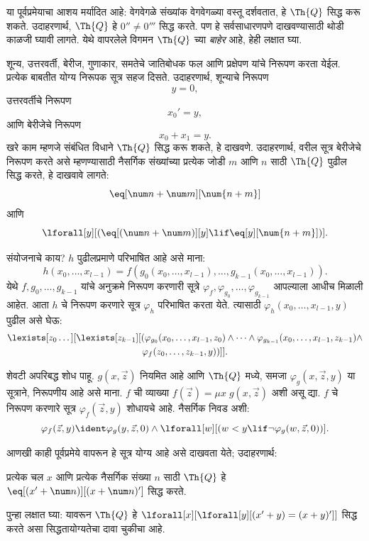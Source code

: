 या पूर्वप्रमेयाचा आशय मर्यादित आहे: वेगवेगळे संख्यांक
वेगवेगळ्या वस्तू दर्शवतात, हे $\Th{Q}$ सिद्ध करू शकते. उदाहरणार्थ,
$\Th{Q}$ हे $0'' \neq 0'''$ सिद्ध करते. पण हे सर्वसाधारणपणे
दाखवण्यासाठी थोडी काळजी घ्यावी लागते. येथे वापरलेले विगमन
$\Th{Q}$ च्या \emph{बाहेर} आहे, हेही लक्षात घ्या.

शून्य, उत्तरवर्ती, बेरीज, गुणाकार, समतेचे जातिबोधक फल
आणि प्रक्षेपण यांचे निरूपण करता येईल. प्रत्येक बाबतीत योग्य
निरूपक सूत्र सहज दिसते. उदाहरणार्थ, शून्याचे निरूपण
\[
y = 0,
\]
उत्तरवर्तीचे निरूपण
\[
x_0' = y,
\]
आणि बेरीजेचे निरूपण
\[
x_0 + x_1 = y.
\]
खरे काम म्हणजे संबंधित विधाने $\Th{Q}$ सिद्ध करू शकते, हे
दाखवणे. उदाहरणार्थ, वरील सूत्र बेरीजेचे निरूपण करते असे
म्हणण्यासाठी नैसर्गिक संख्यांच्या प्रत्येक जोडी $m$ आणि $n$
साठी $\Th{Q}$ पुढील सिद्ध करते, हे दाखवावे लागते:
\[
\eq[\num n + \num m][\num {n+m}]
\]
आणि
\[
\lforall[y][(\eq[(\num n + \num m)][y] \lif \eq[y][\num {n+m}])].
\]

संयोजनाचे काय? $h$ पुढीलप्रमाणे परिभाषित आहे असे माना:
\[
h(x_0,\dots,x_{l-1}) = f(g_0(x_0,\dots,x_{l-1}), \dots,
g_{k-1}(x_0,\dots,x_{l-1})).
\]
येथे $f,g_0,\dots,g_{k-1}$ यांचे अनुक्रमे निरूपण करणारी
सूत्रे $\varphi_f, \varphi_{g_0}, \dots,
\varphi_{g_{k-1}}$ आपल्याला आधीच मिळाली आहेत. आता $h$ चे निरूपण
करणारे सूत्र $\varphi_h$ परिभाषित करता येते. त्यासाठी
$\varphi_h(x_0,\dots,x_{l-1},y)$ पुढील असे घेऊ:
\begin{multline*}
  \lexists[z_0\dots][\lexists[z_{k-1}][(\varphi_{g_0}(x_0,\dots,x_{l-1},z_0) \land
  \dots \land \varphi_{g_{k-1}}(x_0,\dots,x_{l-1},z_{k-1}) \land\\
  \varphi_f(z_0,\dots,z_{k-1},y))]].
\end{multline*}


शेवटी अपरिबद्ध शोध पाहू. $g(x,\vec z)$ नियमित आहे आणि
$\Th{Q}$ मध्ये, समजा $\varphi_g(x,\vec
z,y)$ या सूत्राने, निरूपणीय आहे असे माना. $f$ ची व्याख्या
$f(\vec z) = \mu x \; g(x,\vec z)$ अशी असू द्या. $f$ चे
निरूपण करणारे सूत्र $\varphi_f(\vec z,y)$ शोधायचे आहे. नैसर्गिक
निवड अशी:
\[
\varphi_f(\vec z,y) \ident \varphi_g(y,\vec z,0) \land \lforall[w][(w < y
\lif \lnot \varphi_g(w,\vec z,0))].
\]

आणखी काही पूर्वप्रमेये वापरून हे सूत्र योग्य आहे असे दाखवता येते; उदाहरणार्थ:

\begin{lem}
  प्रत्येक चल $x$ आणि प्रत्येक नैसर्गिक संख्या $n$ साठी $\Th{Q}$
  हे $\eq[(x'
  + \num n)][(x + \num n)']$ सिद्ध करते.
\end{lem}

पुन्हा लक्षात घ्या: यावरून $\Th{Q}$ हे
$\lforall[x][\lforall[y][(x' + y) = (x +y)']]$
सिद्ध करते असा सिद्धतायोग्यतेचा दावा चुकीचा आहे.

